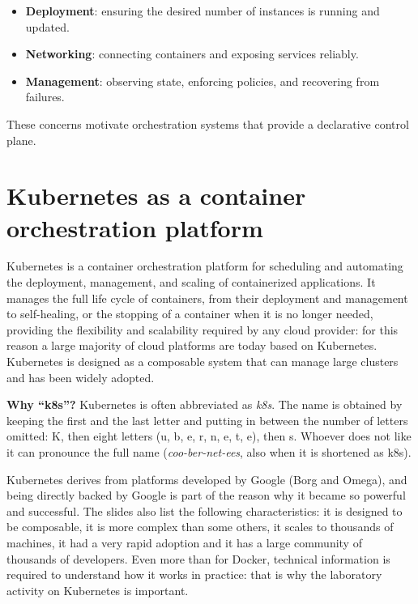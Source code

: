 \begin{itemize}
\item \textbf{Deployment}: ensuring the desired number of instances is running and updated.
\item \textbf{Networking}: connecting containers and exposing services reliably.
\item \textbf{Management}: observing state, enforcing policies, and recovering from failures.
\end{itemize}

These concerns motivate orchestration systems that provide a declarative control plane.

\section{Kubernetes as a container orchestration platform}

Kubernetes is a container orchestration platform for scheduling and automating the deployment, management, and scaling of containerized applications. It manages the full life cycle of containers, from their deployment and management to self-healing, or the stopping of a container when it is no longer needed, providing the flexibility and scalability required by any cloud provider: for this reason a large majority of cloud platforms are today based on Kubernetes. Kubernetes is designed as a composable system that can manage large clusters and has been widely adopted.

\begin{notebox}
	\textbf{Why ``k8s''?} Kubernetes is often abbreviated as \emph{k8s}. The name is obtained by keeping the first and the last letter and putting in between the number of letters omitted: K, then eight letters (u, b, e, r, n, e, t, e), then s. Whoever does not like it can pronounce the full name (\emph{coo-ber-net-ees}, also when it is shortened as k8s).
\end{notebox}

Kubernetes derives from platforms developed by Google (Borg and Omega), and being directly backed by Google is part of the reason why it became so powerful and successful. The slides also list the following characteristics: it is designed to be composable, it is more complex than some others, it scales to thousands of machines, it had a very rapid adoption and it has a large community of thousands of developers. Even more than for Docker, technical information is required to understand how it works in practice: that is why the laboratory activity on Kubernetes is important.

